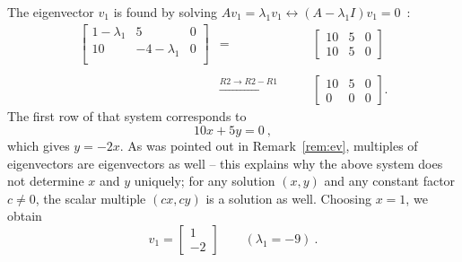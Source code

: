 \begin{example}
\begin{enumerate}[(i)]
		The eigenvector $v_1$ is found  by solving $Av_1=\lambda_1v_1 \leftrightarrow (A-\lambda_1 I)v_1=0$~:
		\[\begin{array}{ccc}
		\left[\begin{array}{cc|c}
		1-\lambda_1 & 5 & 0 \\
		10 & -4-\lambda_1& 0 \\
		\end{array}\right] & = \qquad & \left[\begin{array}{cc|c}
		10 & 5 & 0 \\
		10 & 5 & 0 
		\end{array}\right] \\ & & \\
		& \stackrel{R2 \rightarrow R2 - R1}{\rightarrow} \qquad & 
		\left[\begin{array}{cc|c}
		10 & 5 & 0 \\
		0 &  0 & 0 
		\end{array}\right]
		.\end{array} \]
		The first row of that system corresponds to 
		\[ 10 x + 5 y = 0 \:, \]
		which gives $y = - 2 x$. As was pointed out in Remark~\ref{rem:ev}, multiples of eigenvectors are eigenvectors as well -- this explains why the above system does not determine $x$ and $y$ uniquely; for any solution $(x,y)$ and any constant factor $c\not=0$, the scalar multiple $(cx,cy)$ is a solution as well. Choosing $x=1$, we obtain
		\[v_1 = \begin{bmatrix}
		1 \\ -2
		\end{bmatrix} \qquad (\lambda_1 = -9) \:. \]
				

\end{enumerate}
\end{example}
